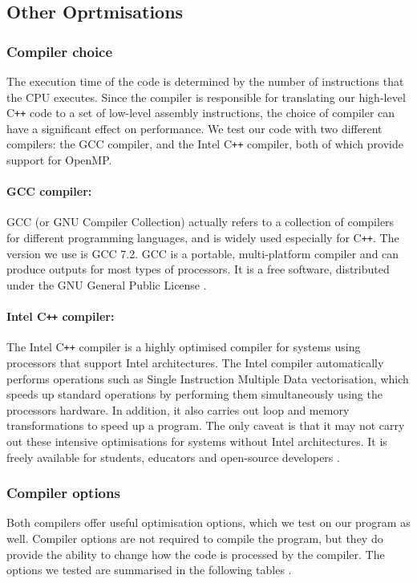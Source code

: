 \documentclass[11pt]{article}
\theoremstyle{theorem}
\theoremstyle{remark}
\theoremstyle{plain}
\theoremstyle{definition}
\begin{document}
\subsection{Other Oprtmisations}
\subsubsection{Compiler choice}
The execution time of the code is determined by the number of instructions that the CPU executes. Since the compiler is responsible for translating our high-level C\texttt{++} code to a set of low-level assembly instructions, the choice of compiler can have a significant effect on performance. We test our code with two different compilers: the GCC compiler, and the Intel C\texttt{++} compiler, both of which provide support for OpenMP.
\paragraph{GCC compiler: } GCC (or GNU Compiler Collection) actually refers to a collection of compilers for different programming languages, and is widely used especially for C\texttt{++}. The version we use is GCC 7.2. GCC is a portable, multi-platform compiler and can produce outputs for most types of processors. It is a free software, distributed under the GNU General Public License \cite{gcc_compiler}.

\paragraph{Intel C\texttt{++} compiler: } The Intel C\texttt{++} compiler is a highly optimised compiler for systems using processors that support Intel architectures. The Intel compiler automatically performs operations such as Single Instruction Multiple Data vectorisation, which speeds up standard operations by performing them simultaneously using the processors hardware. In addition, it also carries out loop and memory transformations to speed up a program. The only caveat is that it may not carry out these intensive optimisations for systems without Intel architectures. It is freely available for students, educators and open-source developers \cite{intel_compiler}.

\subsubsection{Compiler options}
Both compilers offer useful optimisation options, which we test on our program as well. Compiler options are not required to compile the program, but they do provide the ability to change how the code is processed by the compiler. The options we tested are summarised in the following tables \cite{gcc_flags}.
\end{document}

